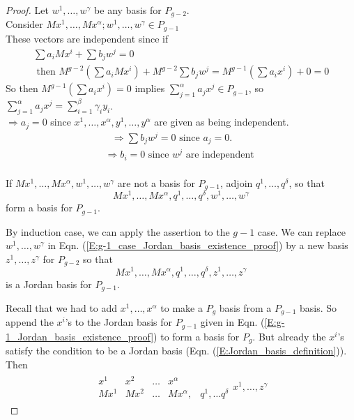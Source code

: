 \documentclass[twoside]{amsart}
\theoremstyle{plain}
\theoremstyle{definition}
\begin{document}
\begin{proof}
Let $w^1, \dots , w^{\gamma}$ be any basis for $P_{g-2}$.  \\

Consider $Mx^1, \dots , Mx^{\alpha}; w^1, \dots , w^{\gamma} \in P_{g-1}$ \\
\phantom{Cons} These vectors are independent since if 
\[
\begin{gathered}
  \sum a_i M x^i + \sum b_j w^j = 0 \\
  \text{ then } M^{g-2} ( \sum a_i Mx^i ) + M^{g-2} \sum b_j w^j = M^{g-1} (\sum a_i x^i ) + 0  = 0 
  \end{gathered}
\]
So then $M^{g-1} ( \sum a_i x^i ) =0 $ implies $\sum_{j=1}^{\alpha} a_j x^j \in P_{g-1}$, so $\sum_{j=1}^{\alpha} a_j x^j = \sum_{i=1}^{\beta} \gamma_i y_i$.  \\
\phantom{So} $\Longrightarrow a_j =0 $ since $x^1, \dots , x^{\alpha}, y^1 , \dots , y^{\alpha}$ are given as being independent.  \bigskip \\
\[
\begin{gathered}
  \text{ $\Longrightarrow \sum b_j w^j = 0 $ since $a_j=0$. }  \\
  \Longrightarrow b_i = 0 \text{ since $w^j$ are independent } \\
\end{gathered}
\]

If $Mx^1, \dots, Mx^{\alpha}, w^1, \dots, w^{\gamma}$ are not a basis for $P_{g-1}$, adjoin $q^1, \dots, q^{\delta}$, so that 
\begin{equation}\label{E:g-1_basis_Jordan_basis_existence_proof}
Mx^1, \dots, Mx^{\alpha}, q^1, \dots , q^{\delta}, w^1, \dots, w^{\gamma}
\end{equation}
form a basis for $P_{g-1}$.  

By induction case, we can apply the assertion to the $g-1$ case.  We can replace $w^1, \dots , w^{\gamma}$ in Eqn. (\ref{E:g-1_case_Jordan_basis_existence_proof}) by a new basis $z^1, \dots, z^{\gamma}$ for $P_{g-2}$ so that 
\begin{equation}\label{E:g-1_Jordan_basis_existence_proof}
Mx^1, \dots, Mx^{\alpha}, q^1, \dots, q^{\delta}, z^1, \dots, z^{\gamma}
\end{equation}
is a Jordan basis for $P_{g-1}$.  

Recall that we had to add $x^1, \dots, x^{\alpha}$ to make a $P_g$ basis from a $P_{g-1}$ basis.  So append the $x^i$'s to the Jordan basis for $P_{g-1}$ given in Eqn. (\ref{E:g-1_Jordan_basis_existence_proof}) to form a basis for $P_g$.  But already the $x^i$'s satisfy the condition to be a Jordan basis (Eqn. (\ref{E:Jordan_basis_definition})).  Then
\[
\begin{gathered}
  \begin{matrix}
    x^1 & x^2 & \dots & x^{\alpha} & \, \\
    Mx^1 & Mx^2 & \dots & Mx^{\alpha} , & q^1, \dots q^{\delta}    
  \end{matrix}
  x^1, \dots , z^{\gamma}
\end{gathered}
\]
\end{proof}
\end{document}
